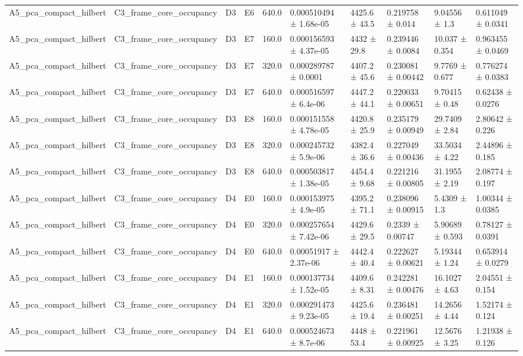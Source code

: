 \begin{table}
\begin{tabular}{llllllllll}
A5\_pca\_compact\_hilbert & C3\_frame\_core\_occupancy & D3 & E6 & 640.0 & 0.000510494 ± 1.68e-05 & 4425.6 ± 43.5 & 0.219758 ± 0.014 & 9.04556 ± 1.3 & 0.611049 ± 0.0341 \\
A5\_pca\_compact\_hilbert & C3\_frame\_core\_occupancy & D3 & E7 & 160.0 & 0.000156593 ± 4.37e-05 & 4432 ± 29.8 & 0.239446 ± 0.0084 & 10.037 ± 0.354 & 0.963455 ± 0.0469 \\
A5\_pca\_compact\_hilbert & C3\_frame\_core\_occupancy & D3 & E7 & 320.0 & 0.000289787 ± 0.0001 & 4407.2 ± 45.6 & 0.230081 ± 0.00442 & 9.7769 ± 0.677 & 0.776274 ± 0.0383 \\
A5\_pca\_compact\_hilbert & C3\_frame\_core\_occupancy & D3 & E7 & 640.0 & 0.000516597 ± 6.4e-06 & 4447.2 ± 44.1 & 0.220033 ± 0.00651 & 9.70415 ± 0.48 & 0.62438 ± 0.0276 \\
A5\_pca\_compact\_hilbert & C3\_frame\_core\_occupancy & D3 & E8 & 160.0 & 0.000151558 ± 4.78e-05 & 4420.8 ± 25.9 & 0.235179 ± 0.00949 & 29.7409 ± 2.84 & 2.80642 ± 0.226 \\
A5\_pca\_compact\_hilbert & C3\_frame\_core\_occupancy & D3 & E8 & 320.0 & 0.000245732 ± 5.9e-06 & 4382.4 ± 36.6 & 0.227049 ± 0.00436 & 33.5034 ± 4.22 & 2.44896 ± 0.185 \\
A5\_pca\_compact\_hilbert & C3\_frame\_core\_occupancy & D3 & E8 & 640.0 & 0.000503817 ± 1.38e-05 & 4454.4 ± 9.68 & 0.221216 ± 0.00805 & 31.1955 ± 2.19 & 2.08774 ± 0.197 \\
A5\_pca\_compact\_hilbert & C3\_frame\_core\_occupancy & D4 & E0 & 160.0 & 0.000153975 ± 4.9e-05 & 4395.2 ± 71.1 & 0.238096 ± 0.00915 & 5.4309 ± 1.3 & 1.00344 ± 0.0385 \\
A5\_pca\_compact\_hilbert & C3\_frame\_core\_occupancy & D4 & E0 & 320.0 & 0.000257654 ± 7.42e-06 & 4429.6 ± 29.5 & 0.2339 ± 0.00747 & 5.90689 ± 0.593 & 0.78127 ± 0.0391 \\
A5\_pca\_compact\_hilbert & C3\_frame\_core\_occupancy & D4 & E0 & 640.0 & 0.00051917 ± 2.37e-06 & 4442.4 ± 40.4 & 0.222627 ± 0.00621 & 5.19344 ± 1.24 & 0.653914 ± 0.0279 \\
A5\_pca\_compact\_hilbert & C3\_frame\_core\_occupancy & D4 & E1 & 160.0 & 0.000137734 ± 1.52e-05 & 4409.6 ± 8.31 & 0.242281 ± 0.00476 & 16.1027 ± 4.63 & 2.04551 ± 0.154 \\
A5\_pca\_compact\_hilbert & C3\_frame\_core\_occupancy & D4 & E1 & 320.0 & 0.000291473 ± 9.23e-05 & 4425.6 ± 19.4 & 0.236481 ± 0.00251 & 14.2656 ± 4.44 & 1.52174 ± 0.124 \\
A5\_pca\_compact\_hilbert & C3\_frame\_core\_occupancy & D4 & E1 & 640.0 & 0.000524673 ± 8.7e-06 & 4448 ± 53.4 & 0.221961 ± 0.00925 & 12.5676 ± 3.25 & 1.21938 ± 0.126 \\

\end{tabular}
\end{table}
